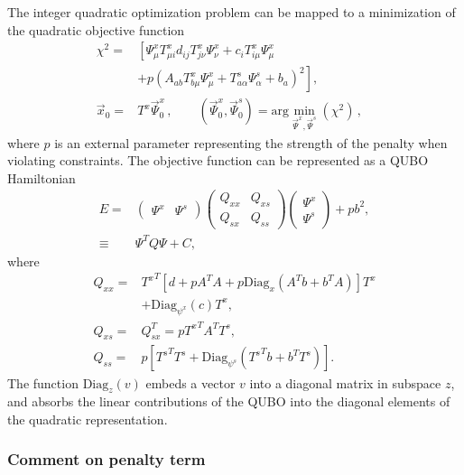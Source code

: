 \documentclass[prd,twocolumn,tightenlines,preprintnumbers,showpacs,superscriptaddress,notitlepage,nofootinbib,eqsecnum,floatfix,longbibliography]{revtex4}
\begin{document}
The integer quadratic optimization problem can be mapped to a minimization of the quadratic objective function
\begin{align}
    \chi^2 = & \left[\Psi^x_{\mu} T^x_{\mu i}d_{ij} T^x_{j \nu}\Psi^x_\nu + c_i T^x_{i\mu} \Psi^x_\mu \right.
    \nonumber\\ \label{eq:qubo-min}
    &\left.+ p (A_{a b} T^x_{b \mu} \Psi^x_{\mu} + T^s_{a \alpha} \Psi^s_\alpha + b_a)^2 \right],\\
    \vec x_0 =&  T^x \vec \Psi^x_0 \, , 
    \qquad (\vec \Psi^x_0, \vec \Psi^s_0) = \mathrm{arg}\min\limits_{\vec{\Psi}^x, \vec \Psi^s}(\chi^2) \,, &
\end{align}
where $p$ is an external parameter representing the strength of the penalty when violating constraints.
The objective function can be represented as a QUBO Hamiltonian
\begin{align}
    E = &
    \begin{pmatrix}
    \Psi^x & \Psi^s
    \end{pmatrix}
    \begin{pmatrix}
    Q_{xx} & Q_{xs}\\
    Q_{sx} & Q_{ss}
    \end{pmatrix}
    \begin{pmatrix}
    \Psi^x\\ \Psi^s
    \end{pmatrix} + pb^2,\\
    \equiv & \Psi^T Q \Psi + C,
    \label{eq:matrix_form}
\end{align}
where
\begin{align}
    Q_{xx} = & {T^{x}}^T \left[ d + p A^T A + p \mathrm{Diag}_{x} \left(A^T b + b^T A\right) \right] T^x \nonumber \\
    &+ \mathrm{Diag}_{\psi^x}(c) T^x,\\
    Q_{xs} = & Q_{sx}^T = p {T^{x}}^T A^T T^s,\\
    Q_{ss} = & p\left[ {T^{s}}^T T^s + \mathrm{Diag}_{\psi^s}\left( {T^{s}}^T b + b^T T^s\right) \right].
\end{align}
The function $\mathrm{Diag}_{z}(v)$ embeds a vector $v$ into a diagonal matrix in subspace $z$, and absorbs the linear contributions of the QUBO into the diagonal elements of the quadratic representation.


\subsubsection{Comment on penalty term}
\label{sec:methods:ilp-qubo-comments}
\end{document}
